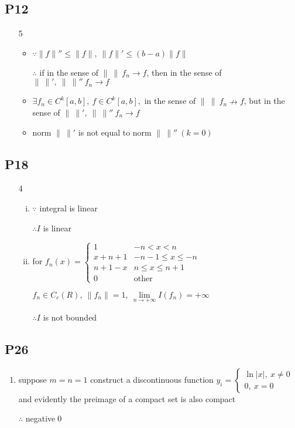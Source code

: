 \subsection{P12}
\begin{enumerate}[1]
    \item[5] 
    \begin{itemize}
        \item $\because \|f\|''\leq\|f\|,\ \|f\|'\leq(b-a)\|f\|$
        \par $\therefore $ if in the sense of $\|\ \|\ f_n \to f $, then in the sense of $\|\ \|',\ \|\ \|''\ f_n \to f $
        \item $ \exists f_n \in C^k[a,b],\ f\in C^k[a,b] ,$ in the sense of $\|\ \|\ f_n \nrightarrow f $, but in the sense of $\|\ \|',\ \|\ \|''\ f_n \to  f $ 
        \item norm $\|\ \|'$ is not equal to norm $\|\ \|''\ (k = 0)$
    \end{itemize}

\end{enumerate}


\subsection{P18}
\begin{enumerate}[1]
    \item[4] 
    \begin{enumerate}[(i)]
        \item 
        $\because $ integral is linear
        \par $\therefore I$ is linear
        \item 
        \par for $f_n(x)=\begin{cases} 1&-n<x<n\\
            x+n+1&-n-1\leqslant x\leqslant -n\\
            n+1-x&n\leqslant x\leqslant n+1\\
            0&\mathrm{other} 
        \end{cases}$
        \par $f_n\in C_c(R),\ \|f_n\|=1,\ \lim \limits_{n \to + \infty} I(f_n) = +\infty $ 
        \par $ \therefore I $ is not bounded
    \end{enumerate} 
    
\end{enumerate}

\subsection{P26}
\begin{enumerate}[5]
    \item
    suppose $m=n=1$ construct a discontinuous function $y_i=
    \begin{cases} \ln|x|,\ x\neq 0 \\ 0,\ x=0
    \end{cases}$ and evidently the preimage of a compact set is also compact 
    \par $\therefore$ negative\qed
\end{enumerate}

